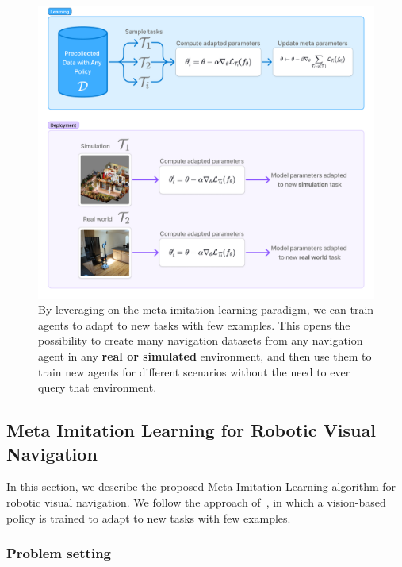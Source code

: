 \begin{figure}
    \centering
    \includegraphics[width=\linewidth]{figures/metanav/graphical_abstract}
    \caption{
        By leveraging on the meta imitation learning paradigm, we can train agents to adapt to new tasks with few examples.
        This opens the possibility to create many navigation datasets from any navigation agent in any \textbf{real or simulated} environment, and then use them to train new agents for different scenarios without the need to ever query that environment.
    }
    \label{fig:abstract_metanav}
\end{figure}

\subsection{Meta Imitation Learning for Robotic Visual Navigation}\label{subsec:meta-imitation-learning-for-robotic-visual-navigation}

In this section, we describe the proposed Meta Imitation Learning algorithm for robotic visual navigation.
We follow the approach of~\cite{finnOneShotVisualImitation2017}, in which a vision-based policy is trained to adapt to new tasks with few examples.

\subsubsection{Problem setting}\label{subsubsec:problem-setting}

